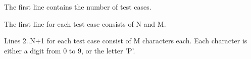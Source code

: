 The first line contains the number of test cases.  

   The first line for each test case consists of N and M.  

   Lines 2..N+1 for each test case consist of M characters each. Each character is either a digit from 0 to 9, or the letter 'P'.
